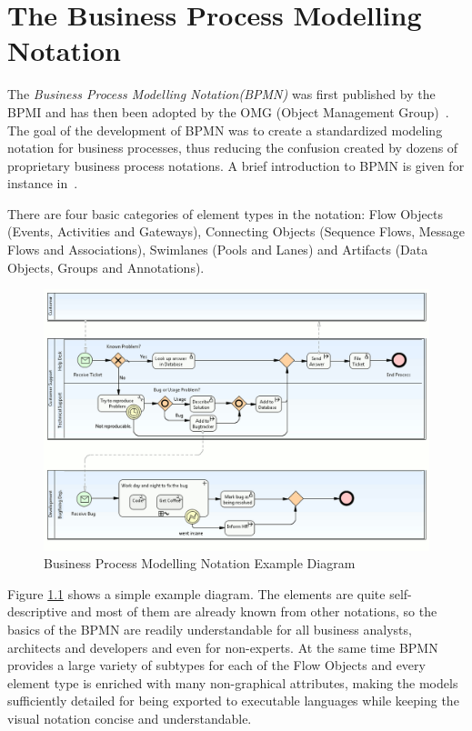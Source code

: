 \chapter{The Business Process Modelling Notation}
\label{sec:bpmn}


The \emph{Business Process Modelling Notation(BPMN)} was first published by the
BPMI and has then been adopted by the OMG (Object Management Group)~\cite{omg2009bpmn}.
The goal of the development of BPMN was to create a standardized modeling notation
for business processes, thus reducing the confusion created by dozens of proprietary
business process notations.  A brief introduction to BPMN is given for instance
in~\cite{white2004introduction}.

There are four basic categories of element types in the notation: Flow Objects
(Events, Activities and Gateways), Connecting Objects (Sequence Flows, Message
Flows and Associations), Swimlanes (Pools and Lanes) and Artifacts (Data Objects,
Groups and Annotations).

\begin{figure}[ht]
	\centering
	\includegraphics[width=.8\textwidth]{figures/bpmn/example.png}
	\caption{Business Process Modelling Notation Example Diagram}
	\label{fig:bpmn_example}
\end{figure}

Figure \ref{fig:bpmn_example} shows a simple example diagram.  The elements are
quite self-descriptive and most of them are already known from other notations,
so the basics of the BPMN are readily understandable for all business analysts,
architects and developers and even for non-experts.  At the same time BPMN provides
a large variety of subtypes for each of the Flow Objects and every element type
is enriched with many non-graphical attributes, making the models sufficiently
detailed for being exported to executable languages while keeping the visual
notation concise and understandable.

